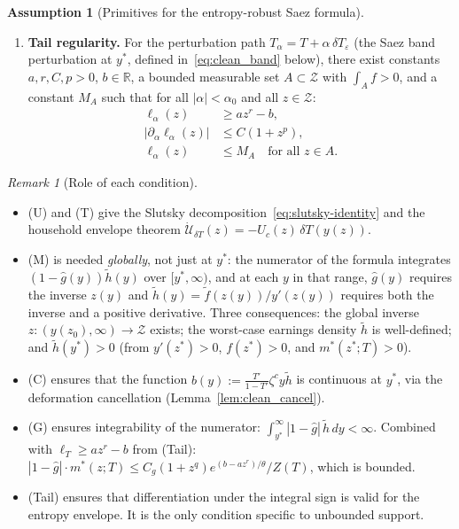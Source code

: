 \documentclass[12pt,a4paper]{article}
\theoremstyle{definition}
\newtheorem{assumption}{Assumption}[section]
\theoremstyle{plain}
\theoremstyle{remark}
\newtheorem{remark}{Remark}[section]
\newcommand{\R}{\mathbb{R}}
\newcommand{\zlow}{z_{\scriptscriptstyle 0}}
\newcommand{\calU}{\mathcal{U}}
\newcommand{\calZ}{\mathcal{Z}}
\begin{document}
\begin{assumption}[Primitives for the entropy-robust Saez formula]
\begin{enumerate}[leftmargin=2.8em]
\item[\textup{(Tail)}] \textbf{Tail regularity.}
For the perturbation path $T_\alpha = T + \alpha\,\delta T_\varepsilon$ (the Saez band perturbation at $y^*$, defined in~\eqref{eq:clean_band} below), there exist constants $a,r,C,p > 0$, $b \in \R$, a bounded measurable set $A \subset \calZ$ with $\int_A f > 0$, and a constant $M_A$ such that for all $|\alpha| < \alpha_0$ and all $z \in \calZ$:
\begin{align}
  \ell_\alpha(z) &\ge az^r - b, \label{eq:clean_tail_lb} \\
  |\partial_\alpha \ell_\alpha(z)| &\le C(1+z^p), \label{eq:clean_tail_deriv} \\
  \ell_\alpha(z) &\le M_A \quad\text{for all }z \in A. \label{eq:clean_tail_local}
\end{align}
\end{enumerate}
\end{assumption}

\begin{remark}[Role of each condition]
\label{rem:clean_roles}
\leavevmode
\begin{itemize}[leftmargin=2em]
\item \textup{(U)} and \textup{(T)} give the Slutsky decomposition~\eqref{eq:slutsky-identity} and the household envelope theorem $\dot{\calU}_{\delta T}(z) = -U_c(z)\,\delta T(y(z))$.
\item \textup{(M)} is needed \emph{globally}, not just at $y^*$: the numerator of the formula integrates $(1-\hat g(y))\widetilde{h}(y)$ over $[y^*,\infty)$, and at each $y$ in that range, $\hat g(y)$ requires the inverse $z(y)$ and $\widetilde{h}(y) = \widetilde{f}(z(y))/y'(z(y))$ requires both the inverse and a positive derivative.  Three consequences: the global inverse $z : (y(\zlow),\infty) \to \calZ$ exists; the worst-case earnings density $\widetilde{h}$ is well-defined; and $\widetilde{h}(y^*) > 0$ (from $y'(z^*) > 0$, $f(z^*) > 0$, and $m^*(z^*;T) > 0$).
\item \textup{(C)} ensures that the function $b(y) := \frac{T'}{1-T'}\zeta^c y\widetilde{h}$ is continuous at $y^*$, via the deformation cancellation (Lemma~\ref{lem:clean_cancel}).
\item \textup{(G)} ensures integrability of the numerator: $\int_{y^*}^\infty |1-\hat g|\,\widetilde{h}\,dy < \infty$.  Combined with $\ell_T \ge az^r - b$ from \textup{(Tail)}: $|1-\hat g|\cdot m^*(z;T) \le C_g(1+z^q)e^{(b-az^r)/\theta}/Z(T)$, which is bounded.
\item \textup{(Tail)} ensures that differentiation under the integral sign is valid for the entropy envelope.  It is the only condition specific to unbounded support.
\end{itemize}
\end{remark}
\end{document}
